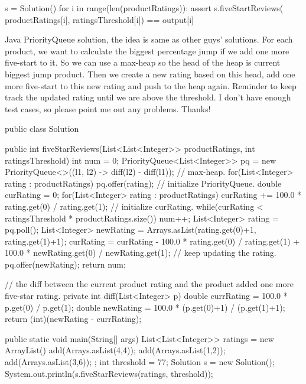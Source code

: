 s = Solution()
for i in range(len(productRatings)):
    assert s.fiveStartReviews(
		productRatings[i], ratingsThreshold[i]) == output[i]
		




		Java PriorityQueue solution, the idea is same as other guys' solutions. For each product, we want to calculate the biggest percentage jump if we add one more five-start to it. So we can use a max-heap so the head of the heap is current biggest jump product. Then we create a new rating based on this head, add one more five-start to this new rating and push to the heap again. Reminder to keep track the updated rating until we are above the threshold. I don't have enough test cases, so please point me out any problems. Thanks!

public class Solution {
    public int fiveStarReviews(List<List<Integer>> productRatings, int ratingsThreshold){
        int num = 0;
        PriorityQueue<List<Integer>> pq = new PriorityQueue<>((l1, l2) -> diff(l2) - diff(l1)); // max-heap.
        for(List<Integer> rating : productRatings) pq.offer(rating); // initialize PriorityQueue.
        double curRating = 0;
        for(List<Integer> rating : productRatings) curRating += 100.0 * rating.get(0) / rating.get(1); // initialize curRating.
        while(curRating < ratingsThreshold * productRatings.size()) {
            num++;
            List<Integer> rating = pq.poll();
            List<Integer> newRating = Arrays.asList(rating.get(0)+1, rating.get(1)+1);
            curRating = curRating - 100.0 * rating.get(0) / rating.get(1) + 100.0 * newRating.get(0) / newRating.get(1); // keep updating the rating.
            pq.offer(newRating);
        }
        return num;
    }

    // the diff between the current product rating and the product added one more five-star rating.
    private int diff(List<Integer> p) {
        double currRating = 100.0 * p.get(0) / p.get(1);
        double newRating = 100.0 * (p.get(0)+1) / (p.get(1)+1);
        return (int)(newRating - currRating);
    }

    public static void main(String[] args) {
        List<List<Integer>> ratings = new ArrayList(){
            {
                add(Arrays.asList(4,4));
                add(Arrays.asList(1,2));
                add(Arrays.asList(3,6));
            }
        };
        int threshold = 77;
        Solution s = new Solution();
        System.out.println(s.fiveStarReviews(ratings, threshold));
    }
}



